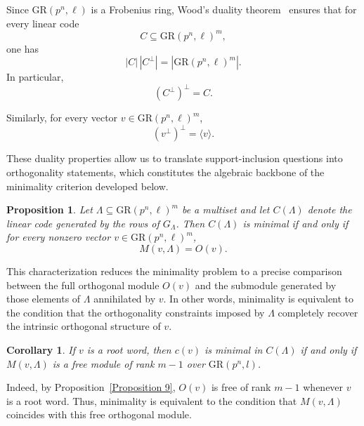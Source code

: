 \documentclass[10pt]{article}
\newtheorem{prop}[lem]{Proposition}
\newtheorem{coro}[lem]{Corollary}
\theoremstyle{definition}
\begin{document}
\medskip

Since $\mathrm{GR}(p^{n},\ell)$ is a Frobenius ring,
Wood's duality theorem~\cite{Wood} ensures that for every linear code
\[
C \subseteq \mathrm{GR}(p^{n},\ell)^{m},
\]
one has
\[
|C|\,|C^{\perp}| = |\mathrm{GR}(p^{n},\ell)^{m}|.
\]
In particular,
\[
(C^{\perp})^{\perp} = C.
\]

Similarly, for every vector $v \in \mathrm{GR}(p^{n},\ell)^{m}$,
\[
(v^{\perp})^{\perp} = \langle v \rangle.
\]

These duality properties allow us to translate support-inclusion
questions into orthogonality statements,
which constitutes the algebraic backbone of the minimality criterion developed below.

\medskip

\begin{prop}
Let $\Lambda \subseteq \mathrm{GR}(p^{n},\ell)^{m}$ be a multiset and
let $C(\Lambda)$ denote the linear code generated by the rows of $G_\Lambda$.
Then $C(\Lambda)$ is minimal if and only if for every nonzero vector
$v \in \mathrm{GR}(p^{n},\ell)^{m}$,
\[
M(v,\Lambda)=O(v).
\]
\end{prop}

\medskip

This characterization reduces the minimality problem to a precise comparison
between the full orthogonal module $O(v)$ and the submodule generated
by those elements of $\Lambda$ annihilated by $v$.
In other words, minimality is equivalent to the condition that
the orthogonality constraints imposed by $\Lambda$
completely recover the intrinsic orthogonal structure of $v$.

\begin{coro}\label{Corollary 8}
If $v$ is a root word, then $c(v)$ is minimal in $C(\Lambda)$
if and only if $M(v,\Lambda)$ is a free module of rank $m-1$
over $\mathrm{GR}(p^n,l)$.
\end{coro}

\medskip

Indeed, by Proposition~\ref{Proposition 9},
$O(v)$ is free of rank $m-1$ whenever $v$ is a root word.
Thus, minimality is equivalent to the condition that
$M(v,\Lambda)$ coincides with this free orthogonal module.
\end{document}
